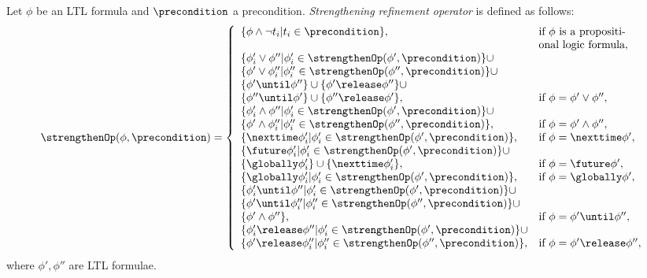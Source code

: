 \begin{definition}\label{def:strength-op}
    Let $\phi$ be an LTL formula and $\precondition$ a precondition. 
    {\em Strengthening refinement operator} is defined as follows:
    \begin{equation}
        \nonumber
        \strengthenOp(\phi,\precondition) =
        \left\{
            \begin{array}{ll}
            \{ \phi \land \lnot t_i | t_i \in \precondition \}, & \text{if } \phi \text{ is a propositi-}\\ 
            &\text{onal logic formula},\\ 
            \{ \phi_i' \lor \phi'' | \phi_i' \in \strengthenOp(\phi',\precondition) \} \cup\\
            \{ \phi' \lor \phi_i'' | \phi_i'' \in \strengthenOp(\phi'',\precondition) \} \cup\\
            \{ \phi' \until \phi'' \} \cup \{ \phi' \release \phi'' \} \cup \\
            \{ \phi'' \until \phi' \} \cup \{ \phi'' \release \phi' \}, & \text{if } \phi = \phi' \lor \phi'',\\
            \{ \phi_i' \land \phi'' | \phi_i' \in \strengthenOp(\phi',\precondition) \} \cup\\
            \{ \phi' \land \phi_i'' | \phi_i'' \in \strengthenOp(\phi'',\precondition) \}, & \text{if } \phi = \phi' \land \phi'', \\
            \{ \nexttime \phi_i' | \phi_i' \in \strengthenOp(\phi',\precondition) \}, & \text{if } \phi = \nexttime \phi', \\
            \{ \future \phi_i' | \phi_i' \in \strengthenOp(\phi',\precondition) \} \cup\\
            \{ \globally \phi_i' \} \cup \{ \nexttime \phi_i' \}, & \text{if } \phi = \future \phi', \\
            \{ \globally \phi_i' | \phi_i' \in \strengthenOp(\phi',\precondition) \}, & \text{if } \phi = \globally \phi', \\
            \{ \phi_i' \until \phi'' | \phi_i' \in \strengthenOp(\phi',\precondition) \} \cup\\
            \{ \phi' \until \phi_i'' | \phi_i'' \in \strengthenOp(\phi'',\precondition) \} \cup\\
            \{ \phi' \land \phi'' \}, & \text{if } \phi = \phi' \until \phi'', \\
            \{ \phi_i' \release \phi'' | \phi_i' \in \strengthenOp(\phi',\precondition) \} \cup\\
            \{ \phi' \release \phi_i'' | \phi_i'' \in \strengthenOp(\phi'',\precondition) \}, & \text{if } \phi = \phi' \release \phi'', \\
            \end{array}
        \right.
    \end{equation}
    where $\phi',\phi''$ are LTL formulae.
\end{definition}

